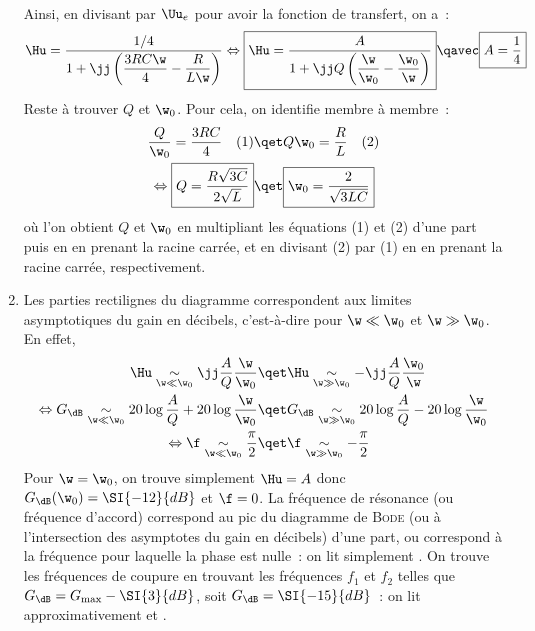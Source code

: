 \documentclass[a4paper, 12pt, final, garamond]{book}
\begin{document}
\begin{enumerate}
\begin{gather*}
        \end{gather*}
        Ainsi, en divisant par $\Uu_e$ pour avoir la fonction de transfert, on
        a~:
        \begin{gather*}
            \Hu = \frac{1/4} {1+\jj\left(\dfrac{3RC\w}{4}-\dfrac{R}{L\w}\right)}
            \Leftrightarrow
            \boxed{\Hu = \frac{A}{1+\jj Q \left( \dfrac{\w}{\w_0} -
                \dfrac{\w_0}{\w} \right)}}
            \qavec
            \boxed{A = \frac{1}{4}}
        \end{gather*}
        Reste à trouver $Q$ et $\w_0$. Pour cela, on identifie membre à membre~:
        \begin{align*}
            \frac{Q}{\w_0} = \frac{3RC}{4} \quad (1)
            &\qet
            Q\w_0 = \frac{R}{L} \quad (2)\\
            \Leftrightarrow
            \boxed{Q = \frac{R\sqrt{3C}}{2\sqrt{L}}}
            &\qet
            \boxed{\w_0 = \frac{2}{\sqrt{3LC}}}
        \end{align*}
        où l'on obtient $Q$ et $\w_0$ en multipliant les équations (1) et (2)
        d'une part puis en en prenant la racine carrée, et en divisant (2) par
        (1) en en prenant la racine carrée, respectivement.
    \item Les parties rectilignes du diagramme correspondent aux limites
        asymptotiques du gain en décibels, c'est-à-dire pour $\w \ll \w_0$ et
        $\w \gg \w_0$. En effet,
        \begin{align*}
            \Hu \underset{\w \ll \w_0}{\sim} \jj \frac{A}{Q} \frac{\w}{\w_0}
            &\qet
            \Hu \underset{\w \gg \w_0}{\sim} -\jj \frac{A}{Q} \frac{\w_0}{\w}
            \\
            \Leftrightarrow
            G_{\dB} \underset{\w \ll \w_0}{\sim}
                20 \log \frac{A}{Q} + 20 \log \frac{\w}{\w_0}
            &\qet
            G_{\dB} \underset{\w \gg \w_0}{\sim}
                20 \log \frac{A}{Q} - 20 \log \frac{\w}{\w_0}
            \\
            \Leftrightarrow
            \f \underset{\w \ll \w_0}{\sim} \frac{\pi}{2}
            &\qet
            \f \underset{\w \gg \w_0}{\sim} - \frac{\pi}{2}
        \end{align*}
        Pour $\w = \w_0$, on trouve simplement $\Hu = A$ donc $G_{\dB}(\w_0) =
        \SI{-12}{dB}$ et $\f = 0$. La fréquence de résonance (ou fréquence d'accord)
        correspond au pic du diagramme de \textsc{Bode} (ou à l'intersection des
        asymptotes du gain en décibels) d'une part, ou correspond à la fréquence
        pour laquelle la phase est nulle~: on lit simplement . \bigbreak
        On trouve les fréquences de coupure en trouvant les fréquences $f_1$ et
        $f_2$ telles que $G_{\dB} = G_{\max} - \SI{3}{dB}$, soit $G_{\dB} =
        \SI{-15}{dB}$~: on lit approximativement  et
        .
\end{enumerate}
\end{document}
